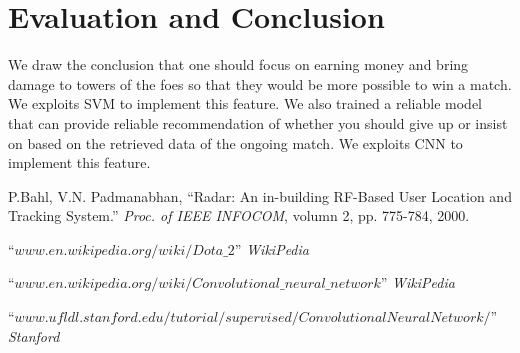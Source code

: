 \documentclass[a4paper, 11pt]{article} %
\begin{document}
\section{Evaluation and Conclusion}
We draw the conclusion that one should focus on earning money and bring damage to towers of the foes so that they would be more possible to win a match. We exploits SVM to implement this feature.
We also trained a reliable model that can provide reliable recommendation of whether you should give up or insist on based on the retrieved data of the ongoing match. We exploits CNN to implement this feature.


\begin{thebibliography}{10}

P.Bahl, V.N. Padmanabhan,
``Radar: An in-building RF-Based User Location and Tracking System.''
\textit{Proc. of IEEE INFOCOM}, volumn 2, pp. 775-784, 2000.

``$www.en.wikipedia.org/wiki/Dota\_2$''
\textit{WikiPedia}

``$www.en.wikipedia.org/wiki/Convolutional\_neural\_network$''
\textit{WikiPedia}

``$www.ufldl.stanford.edu/tutorial/supervised/ConvolutionalNeuralNetwork/$''
\textit{Stanford}
\end{thebibliography}

\end{document}
